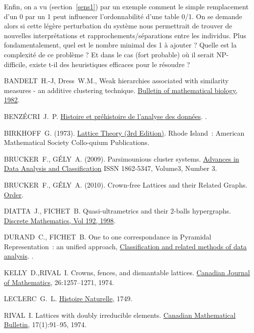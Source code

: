 \documentclass[a4paper]{report}
\begin{document}
Enfin, on a vu (section~\ref{sens1}) par un exemple comment le simple remplacement d'un 0 par un 1 peut influencer l'ordonnabilité d'une table 0/1. On se demande alors 
si cette légère perturbation du système nous permettrait de trouver de nouvelles interprétations et rapprochements/séparations entre les individus. Plus fondamentalement, quel est le
 nombre minimal des 1 à ajouter ? Quelle est la complexité de ce problème ? Et dans le cas (fort probable) où il serait NP-difficile, existe t-il des heuristiques efficaces pour le résoudre ?  




\begin{thebibliography}{9}
BANDELT~H.-J, Dress~W.M.,
\newblock Weak hierarchies associated with similarity measures - an additive clustering technique.
\newblock \underline{Bulletin of mathematical biology, 1982}.

BENZÉCRI~J.~P.
\newblock \underline{Histoire et préhistoire de l'analyse des données}.
.

BIRKHOFF~G. (1973).
\newblock  \underline{Lattice Theory (3rd Edition)}.
\newblock Rhode Island~: American Mathematical Society Collo-quium Publications.

BRUCKER~F., GÉLY~A. (2009).
\newblock Parsimounious cluster systems.
\newblock \underline{Advances in Data Analysis and Classification} ISSN 1862-5347, Volume3, Number 3.

BRUCKER~F., GÉLY~A. (2010).
\newblock Crown-free Lattices and their Related Graphs.
\newblock \underline{Order}.

DIATTA~J., FICHET~B.
\newblock Quasi-ultrametrics and their 2-balls hypergraphs.
\newblock \underline{Discrete Mathematics, Vol 192, 1998}.

DURAND~C., FICHET~B.
\newblock One to one correspondance in Pyramidal Representation~: an unified approach, \underline{Classification and related methods of data analysis}.
.

KELLY~D.,RIVAL~I.
\newblock Crowns, fences, and dismantable lattices.
\newblock \underline{Canadian Journal of Mathematics}, 26:1257--1271, 1974.

LECLERC~G.~L.
\newblock \underline{Histoire Naturelle}, 1749.

RIVAL~I.
\newblock Lattices with doubly irreducible elements.
\newblock \underline{Canadian Mathematical Bulletin}, 17(1):91--95, 1974.

\end{thebibliography}

\listoffigures
{}
\listoftables
{}
\end{document}
